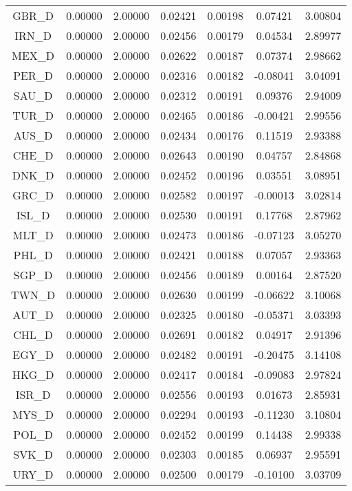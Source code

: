 \begin{longtable}{c c c c c c c}
GBR_D & 0.00000 & 2.00000 & 0.02421 & 0.00198 & 0.07421 & 3.00804 \\
IRN_D & 0.00000 & 2.00000 & 0.02456 & 0.00179 & 0.04534 & 2.89977 \\
MEX_D & 0.00000 & 2.00000 & 0.02622 & 0.00187 & 0.07374 & 2.98662 \\
PER_D & 0.00000 & 2.00000 & 0.02316 & 0.00182 & -0.08041 & 3.04091 \\
SAU_D & 0.00000 & 2.00000 & 0.02312 & 0.00191 & 0.09376 & 2.94009 \\
TUR_D & 0.00000 & 2.00000 & 0.02465 & 0.00186 & -0.00421 & 2.99556 \\
AUS_D & 0.00000 & 2.00000 & 0.02434 & 0.00176 & 0.11519 & 2.93388 \\
CHE_D & 0.00000 & 2.00000 & 0.02643 & 0.00190 & 0.04757 & 2.84868 \\
DNK_D & 0.00000 & 2.00000 & 0.02452 & 0.00196 & 0.03551 & 3.08951 \\
GRC_D & 0.00000 & 2.00000 & 0.02582 & 0.00197 & -0.00013 & 3.02814 \\
ISL_D & 0.00000 & 2.00000 & 0.02530 & 0.00191 & 0.17768 & 2.87962 \\
MLT_D & 0.00000 & 2.00000 & 0.02473 & 0.00186 & -0.07123 & 3.05270 \\
PHL_D & 0.00000 & 2.00000 & 0.02421 & 0.00188 & 0.07057 & 2.93363 \\
SGP_D & 0.00000 & 2.00000 & 0.02456 & 0.00189 & 0.00164 & 2.87520 \\
TWN_D & 0.00000 & 2.00000 & 0.02630 & 0.00199 & -0.06622 & 3.10068 \\
AUT_D & 0.00000 & 2.00000 & 0.02325 & 0.00180 & -0.05371 & 3.03393 \\
CHL_D & 0.00000 & 2.00000 & 0.02691 & 0.00182 & 0.04917 & 2.91396 \\
EGY_D & 0.00000 & 2.00000 & 0.02482 & 0.00191 & -0.20475 & 3.14108 \\
HKG_D & 0.00000 & 2.00000 & 0.02417 & 0.00184 & -0.09083 & 2.97824 \\
ISR_D & 0.00000 & 2.00000 & 0.02556 & 0.00193 & 0.01673 & 2.85931 \\
MYS_D & 0.00000 & 2.00000 & 0.02294 & 0.00193 & -0.11230 & 3.10804 \\
POL_D & 0.00000 & 2.00000 & 0.02452 & 0.00199 & 0.14438 & 2.99338 \\
SVK_D & 0.00000 & 2.00000 & 0.02303 & 0.00185 & 0.06937 & 2.95591 \\
URY_D & 0.00000 & 2.00000 & 0.02500 & 0.00179 & -0.10100 & 3.03709 \\

\end{longtable}
